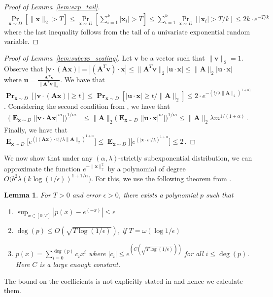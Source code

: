 \documentclass[10pt,a4paper]{article}
\newtheorem{lemma}{Lemma}[section]
\newcommand\twonorm[1]{\|#1\|_2}
\renewcommand\vec[1]{\mathbf{#1}}
\DeclareMathOperator*{\pr}{\mathbf{Pr}}
\DeclareMathOperator*{\E}{\mathbf{E}}
\newcommand{\1}{\Ind}
\newcommand{\x}{\vec x}
\newcommand{\vv}{\vec v}
\newcommand{\vu}{\vec u}
\begin{document}
\begin{proof}[Proof of Lemma~\ref{lem:exp_tail}]
\label{proof:exp_tail}
    \begin{align*}
        \Pr_{\x\sim D}\left[\twonorm{\x}>T\right]\leq \Pr_{\x\sim D}\left[\sum_{i=1}^{k}|\x_i|>T\right]
        \leq \sum_{i=1}^{k}\Pr_{\x\sim D}\left[|\x_i|>T/k\right]
        \leq 2k\cdot e^{-T/k}
    \end{align*}
    where the last inequality follows from the tail of a univariate exponential random variable.
\end{proof}
\begin{proof}[Proof of Lemma~\ref{lem:subexp_scaling}]
\label{proof:subexp_scaling}
Let $\vv$ be a vector such that $\twonorm{\vv}=1$. Observe that $|\vv\cdot (\vec A\x)|=|(\vec A^T\vv)\cdot \x|\leq \twonorm{\vec A^T\vv}|\vu\cdot \x|\leq \twonorm{\vec A}|\vu\cdot \x|$ where $\vu=\frac{\vec A^T\vv}{\twonorm{\vec A^T\vv}}$. We have that $\pr_{\x\sim D}[|\vv\cdot (\vec A\x)|\geq t]\leq \pr_{\x\sim D}[|\vu\cdot \x|\geq t/\twonorm{\vec A}]\leq 2\cdot e^{-(t/\lambda\twonorm{\vec A})^{1+\alpha)}}$. Considering the second condition from , we have that \begin{align*}
    \biggl(\E_{\x\sim D}\bigl[|\vv\cdot \vec A\x|^m\bigr]\biggr)^{1/m}&\leq \twonorm{\vec A}\biggl(\E_{\x\sim D}\bigl[|\vu\cdot\x|^m \bigr]\biggr)^{1/m}
    \leq \twonorm{\vec A}\lambda m^{1/(1+\alpha)}\,.
\end{align*} Finally, we have that
$\E_{\x\sim D}\bigl[e^{(|(\vec A\x)\cdot v|/\lambda\twonorm{\vec A})^{1+\alpha}}\bigr]\leq \E_{\x\sim D}]\bigl[e^{(|\x\cdot v|/\lambda)^{1+\alpha}}\bigr]\leq 2\,.$ 
\end{proof}


We now show that under any $(\alpha,\lambda)$-strictly subexponential distribution, we can approximate the function $e^{-\twonorm{\x}^2}$ by a polynomial of degree $O\bigl(b^{2}\lambda (k\log(1/\epsilon))^{1+1/\alpha} \bigr)$. For this, we use the following theorem from \cite{AA22}.

\begin{lemma}
\label{thm:exp_approx}
    For $T>0$ and error $\epsilon>0$, there exists a polynomial $p$ such that
   \begin{enumerate}
    \item $\sup_{x\in [0,T]}|p(x)-e^{(-x)}|\leq \epsilon $   
    \item $\deg(p)\leq O(\sqrt{T\log(1/\epsilon)})$, if $T=\omega\left(\log1/\epsilon\right)$
    \item $p(x)=\sum_{i=0}^{\deg(p)}c_i x^i$ where $|c_i|\leq e^{\left(C\left(\sqrt{T\log(1/\epsilon)}\right)\right)}$ for all $i\leq \deg(p)$. Here $C$ is a large enough constant.
   \end{enumerate}
\end{lemma}
The bound on the coefficients is not explicitly stated in \cite{AA22} and hence we calculate them.
\end{document}

